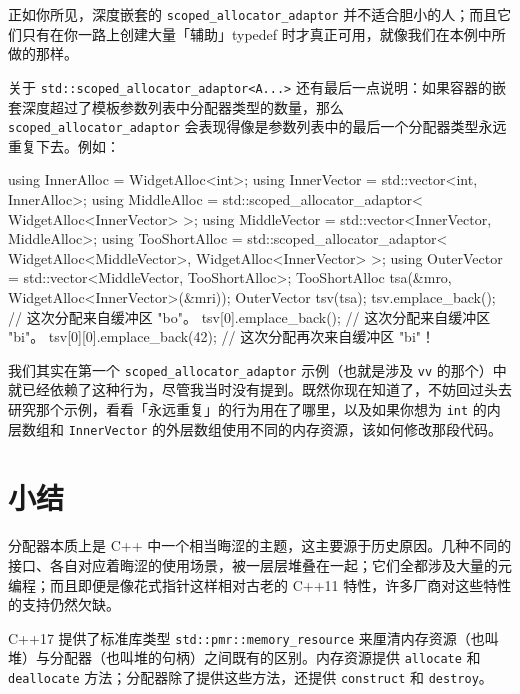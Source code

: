 正如你所见，深度嵌套的 \texttt{scoped\_\allowbreak{}allocator\_\allowbreak{}adaptor} 并不适合胆小的人；而且它们只有在你一路上创建大量「辅助」typedef 时才真正可用，就像我们在本例中所做的那样。

关于 \texttt{std::\allowbreak{}scoped\_\allowbreak{}allocator\_\allowbreak{}adaptor<\allowbreak{}A...>} 还有最后一点说明：如果容器的嵌套深度超过了模板参数列表中分配器类型的数量，那么 \texttt{scoped\_\allowbreak{}allocator\_\allowbreak{}adaptor} 会表现得像是参数列表中的最后一个分配器类型永远重复下去。例如：

\begin{codebox}[cpp]
    using InnerAlloc = WidgetAlloc<int>;
    using InnerVector = std::vector<int, InnerAlloc>;
    using MiddleAlloc = std::scoped_allocator_adaptor<
      WidgetAlloc<InnerVector>
    >;
    using MiddleVector = std::vector<InnerVector, MiddleAlloc>;
    using TooShortAlloc = std::scoped_allocator_adaptor<
      WidgetAlloc<MiddleVector>,
      WidgetAlloc<InnerVector>
    >;
    using OuterVector = std::vector<MiddleVector, TooShortAlloc>;
    TooShortAlloc tsa(&mro, WidgetAlloc<InnerVector>(&mri));
    OuterVector tsv(tsa);
    tsv.emplace_back();
      // 这次分配来自缓冲区 "bo"。
    tsv[0].emplace_back();
      // 这次分配来自缓冲区 "bi"。
    tsv[0][0].emplace_back(42);
      // 这次分配再次来自缓冲区 "bi"！
\end{codebox}

我们其实在第一个 \texttt{scoped\_\allowbreak{}allocator\_\allowbreak{}adaptor} 示例（也就是涉及 \texttt{vv} 的那个）中就已经依赖了这种行为，尽管我当时没有提到。既然你现在知道了，不妨回过头去研究那个示例，看看「永远重复」的行为用在了哪里，以及如果你想为 \texttt{int} 的内层数组和 \texttt{Inner\allowbreak{}Vector} 的外层数组使用不同的内存资源，该如何修改那段代码。

\section{小结}

分配器本质上是 C++ 中一个相当晦涩的主题，这主要源于历史原因。几种不同的接口、各自对应着晦涩的使用场景，被一层层堆叠在一起；它们全都涉及大量的元编程；而且即便是像花式指针这样相对古老的 C++11 特性，许多厂商对这些特性的支持仍然欠缺。

C++17 提供了标准库类型 \texttt{std::\allowbreak{}pmr::\allowbreak{}memory\_\allowbreak{}resource} 来厘清内存资源（也叫堆）与分配器（也叫堆的句柄）之间既有的区别。内存资源提供 \texttt{allocate} 和 \texttt{deallocate} 方法；分配器除了提供这些方法，还提供 \texttt{construct} 和 \texttt{destroy}。

